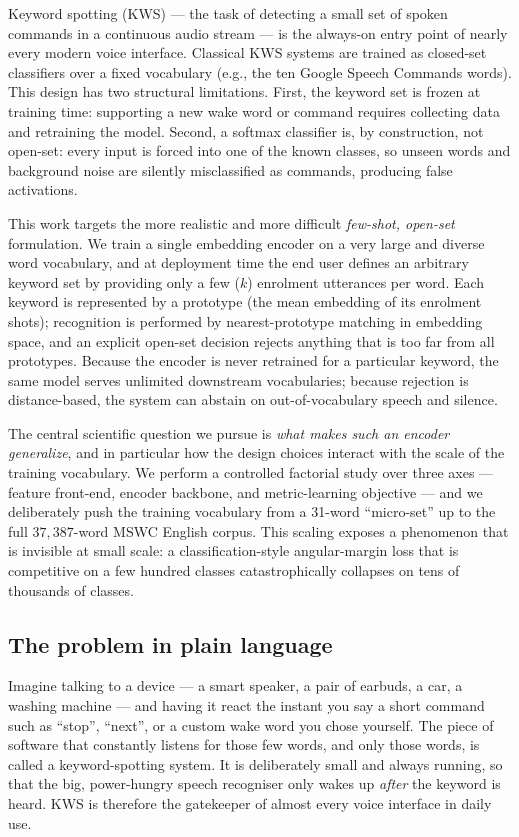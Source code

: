 \documentclass[12pt,a4paper]{article}
\begin{document}
Keyword spotting (KWS) --- the task of detecting a small set of spoken commands
in a continuous audio stream --- is the always-on entry point of nearly every
modern voice interface. Classical KWS systems are trained as closed-set
classifiers over a fixed vocabulary (e.g., the ten Google Speech Commands
words). This design has two structural limitations. First, the keyword set is
frozen at training time: supporting a new wake word or command requires
collecting data and retraining the model. Second, a softmax classifier is, by
construction, not open-set: every input is forced into one of the known classes,
so unseen words and background noise are silently misclassified as commands,
producing false activations.

This work targets the more realistic and more difficult \emph{few-shot,
open-set} formulation. We train a single embedding encoder on a very large and
diverse word vocabulary, and at deployment time the end user defines an
arbitrary keyword set by providing only a few ($k$) enrolment utterances per
word. Each keyword is represented by a prototype (the mean embedding of its
enrolment shots); recognition is performed by nearest-prototype matching in
embedding space, and an explicit open-set decision rejects anything that is too
far from all prototypes. Because the encoder is never retrained for a particular
keyword, the same model serves unlimited downstream vocabularies; because
rejection is distance-based, the system can abstain on out-of-vocabulary speech
and silence.

The central scientific question we pursue is \emph{what makes such an encoder
generalize}, and in particular how the design choices interact with the scale of
the training vocabulary. We perform a controlled factorial study over three axes
--- feature front-end, encoder backbone, and metric-learning objective --- and we
deliberately push the training vocabulary from a 31-word ``micro-set'' up to the
full $37{,}387$-word MSWC English corpus. This scaling exposes a phenomenon that
is invisible at small scale: a classification-style angular-margin loss that is
competitive on a few hundred classes catastrophically collapses on tens of
thousands of classes.

\subsection{The problem in plain language}\label{sec:plain}

Imagine talking to a device --- a smart speaker, a pair of earbuds, a car, a
washing machine --- and having it react the instant you say a short command such
as ``stop'', ``next'', or a custom wake word you chose yourself. The piece of
software that constantly listens for those few words, and only those words, is
called a keyword-spotting system. It is deliberately small and always running,
so that the big, power-hungry speech recogniser only wakes up \emph{after} the
keyword is heard. KWS is therefore the gatekeeper of almost every voice
interface in daily use.
\end{document}
